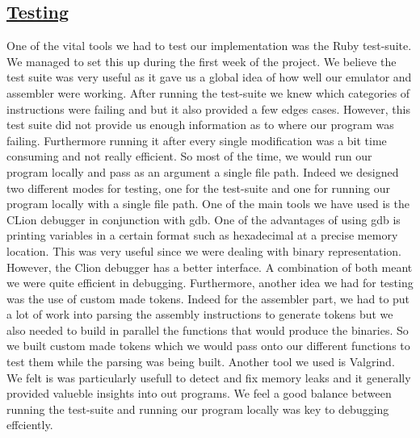 \documentclass[10pt]{article}
\begin{document}
\subsection{\underline{Testing}}
One of the vital tools we had to test our implementation was the Ruby test-suite. We managed to set this up during the first week of the project. We believe the test suite was very useful as it gave us a global idea of how well our emulator and assembler were working. After running the test-suite we knew which categories of instructions were failing and but it also provided a few edges cases. However, this test suite did not provide us enough information as to where our program was failing. Furthermore running it after every single modification was a bit time consuming and not really efficient. So most of the time, we would run our program locally and pass as an argument a single file path. Indeed we designed two different modes for testing, one for the test-suite and one for running our program locally with a single file path. One of the main tools we have used is the CLion debugger in conjunction with gdb. One of the advantages of using gdb is printing variables in a certain format such as hexadecimal at a precise memory location. This was very useful since we were dealing with binary representation. However, the Clion debugger has a better interface. A combination of both meant we were quite efficient in debugging. Furthermore, another idea we had for testing was the use of custom made tokens. Indeed for the assembler part, we had to put a lot of work into parsing the assembly instructions to generate tokens but we also needed to build in parallel the functions that would produce the binaries. So we built custom made tokens which we would pass onto our different functions to test them while the parsing was being built. Another tool we used is Valgrind. We felt is was particularly usefull to detect and fix memory leaks and it generally provided valueble insights into out programs. We feel a good balance between running the test-suite and running our program locally was key to debugging effciently.
\end{document}
